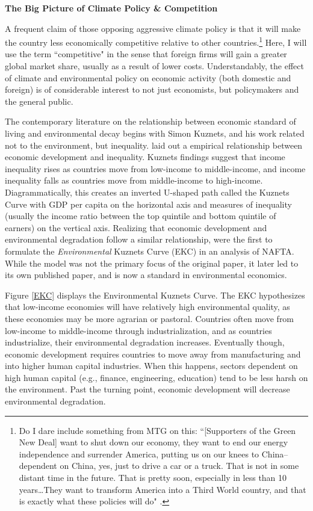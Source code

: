 \textbf{The Big Picture of Climate Policy \& Competition}

A frequent claim of those opposing aggressive climate policy is that it will make the country less economically competitive relative to other countries.\footnote{Do I dare include something from MTG on this: ``[Supporters of the Green New Deal] want to shut down our economy, they want to end  our energy independence and surrender America, putting us on our knees to China--dependent on China, yes, just to drive a car or a truck. That is not in some distant time in the future. That is pretty soon, especially in less than 10 years\ldots They want to transform America into a Third World country, and that is exactly what these policies will do" \citep{marjorie_greene}.} Here, I will use the term ``competitive" in the sense that foreign firms will gain a greater global market share, usually as a result of lower costs. Understandably, the effect of climate and environmental policy on economic activity (both domestic and foreign) is of considerable interest to not just economists, but policymakers and the general public.

The contemporary literature on the relationship between economic standard of living and environmental decay begins with Simon Kuznets, and his work related not to the environment, but inequality. \cite{kuznets1955economic} laid out a empirical relationship between economic development and inequality. Kuznets findings suggest that income inequality rises as countries move from low-income to middle-income, and income inequality falls as countries move from middle-income to high-income. Diagrammatically, this creates an inverted U-shaped path called the Kuznets Curve with GDP per capita on the horizontal axis and measures of inequality (usually the income ratio between the top quintile and bottom quintile of earners) on the vertical axis. Realizing that economic development and environmental degradation follow a similar relationship, \cite{NBERw3914} were the first to formulate the \emph{Environmental} Kuznets Curve (EKC) in an analysis of NAFTA. While the model was not the primary focus of the original paper, it later led to its own published paper, \cite{grossman1995economic} and is now a standard in environmental economics. 

Figure \ref{EKC} displays the Environmental Kuznets Curve. The EKC hypothesizes that low-income economies will have relatively high environmental quality, as these economies may be more agrarian or pastoral. Countries often move from low-income to middle-income through industrialization, and as countries industrialize, their environmental degradation increases. Eventually though, economic development requires countries to move away from manufacturing and into higher human capital industries. When this happens, sectors dependent on high human capital (e.g., finance, engineering, education) tend to be less harsh on the environment. Past the turning point, economic development will decrease environmental degradation. 

